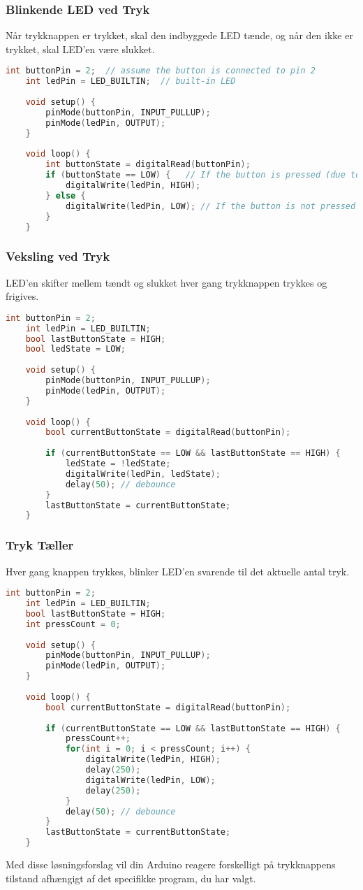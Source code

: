 \subsubsection*{Blinkende LED ved Tryk}
Når trykknappen er trykket, skal den indbyggede LED tænde, og når den ikke er trykket, skal LED'en være slukket.
\begin{lstlisting}[language=C++]
	int buttonPin = 2;  // assume the button is connected to pin 2
	int ledPin = LED_BUILTIN;  // built-in LED
	
	void setup() {
		pinMode(buttonPin, INPUT_PULLUP);
		pinMode(ledPin, OUTPUT);
	}
	
	void loop() {
		int buttonState = digitalRead(buttonPin);
		if (buttonState == LOW) {   // If the button is pressed (due to INPUT_PULLUP)
			digitalWrite(ledPin, HIGH);
		} else {
			digitalWrite(ledPin, LOW); // If the button is not pressed
		}
	}
\end{lstlisting}

\subsubsection*{Veksling ved Tryk}
LED'en skifter mellem tændt og slukket hver gang trykknappen trykkes og frigives.
\begin{lstlisting}[language=C++]
	int buttonPin = 2;
	int ledPin = LED_BUILTIN;
	bool lastButtonState = HIGH;
	bool ledState = LOW;
	
	void setup() {
		pinMode(buttonPin, INPUT_PULLUP);
		pinMode(ledPin, OUTPUT);
	}
	
	void loop() {
		bool currentButtonState = digitalRead(buttonPin);
		
		if (currentButtonState == LOW && lastButtonState == HIGH) {
			ledState = !ledState;
			digitalWrite(ledPin, ledState);
			delay(50); // debounce
		}
		lastButtonState = currentButtonState;
	}
\end{lstlisting}

\subsubsection*{Tryk Tæller}
Hver gang knappen trykkes, blinker LED'en svarende til det aktuelle antal tryk.
\begin{lstlisting}[language=C++]
	int buttonPin = 2;
	int ledPin = LED_BUILTIN;
	bool lastButtonState = HIGH;
	int pressCount = 0;
	
	void setup() {
		pinMode(buttonPin, INPUT_PULLUP);
		pinMode(ledPin, OUTPUT);
	}
	
	void loop() {
		bool currentButtonState = digitalRead(buttonPin);
		
		if (currentButtonState == LOW && lastButtonState == HIGH) {
			pressCount++;
			for(int i = 0; i < pressCount; i++) {
				digitalWrite(ledPin, HIGH);
				delay(250);
				digitalWrite(ledPin, LOW);
				delay(250);
			}
			delay(50); // debounce
		}
		lastButtonState = currentButtonState;
	}
\end{lstlisting}
Med disse løsningsforslag vil din Arduino reagere forskelligt på trykknappens tilstand afhængigt af det specifikke program, du har valgt.

